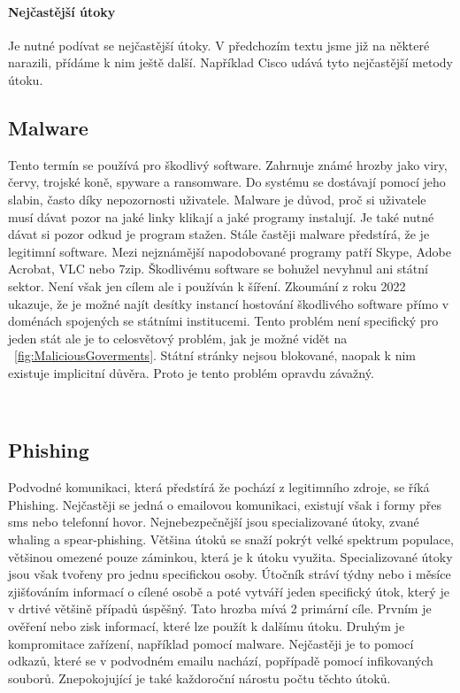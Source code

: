 \paragraph{Nejčastější útoky}
Je nutné podívat se nejčastější útoky.
V předchozím textu jsme již na některé narazili, přídáme k nim ještě další.
Například Cisco udává tyto nejčastější metody útoku\cite{cisco_most_common_attack}.

\subsection{Malware}
Tento termín se používá pro škodlivý software.
Zahrnuje známé hrozby jako viry, červy, trojské koně, spyware a ransomware.
Do systému se dostávají pomocí jeho slabin, často díky nepozornosti uživatele.\cite{cisco_most_common_attack}
Malware je důvod, proč si uživatele musí dávat pozor na jaké linky klikají a jaké programy instalují.
Je také nutné dávat si pozor odkud je program stažen.
Stále častěji malware předstírá, že je legitimní software.
Mezi nejznámější napodobované programy patří Skype, Adobe Acrobat, VLC nebo 7zip.\cite{virustotal_report_findings}
Škodlivému software se bohužel nevyhnul ani státní sektor.
Není však jen cílem ale i používán k šíření.
Zkoumání z roku 2022 ukazuje, že je možné najít desítky instancí hostování škodlivého software přímo v doménách spojených se státními institucemi.\cite{virustotal_report_findings_goverment}
Tento problém není specifický pro jeden stát ale je to celosvětový problém, jak je možné vidět na ~\ref{fig:MaliciousGoverments}.
Státní stránky nejsou blokované, naopak k nim existuje implicitní důvěra.
Proto je tento problém opravdu závažný.

~\label{fig:MaliciousGoverments}

\subsection{Phishing}
Podvodné komunikaci, která předstírá že pochází z legitimního zdroje, se říká Phishing\cite{cisco_most_common_attack}.
Nejčastěji se jedná o emailovou komunikaci, existují však i formy přes sms nebo telefonní hovor.
Nejnebezpečnější jsou specializované útoky, zvané whaling a spear-phishing.
Většina útoků se snaží pokrýt velké spektrum populace, většinou omezené pouze záminkou, která je k útoku využita.
Specializované útoky jsou však tvořeny pro jednu specifickou osoby.
Útočník stráví týdny nebo i měsíce zjišťováním informací o cílené osobě a poté vytváří jeden specifický útok, který je v drtivé většině případů úspěšný.
Tato hrozba mívá 2 primární cíle.
Prvním je ověření nebo zisk informací, které lze použít k dalšímu útoku.
Druhým je kompromitace zařízení, například pomocí malware.
Nejčastěji je to pomocí odkazů, které se v podvodném emailu nachází, popřípadě pomocí infikovaných souborů.
Znepokojující je také každoroční nárostu počtu těchto útoků.\cite{moje_bakalarka}

